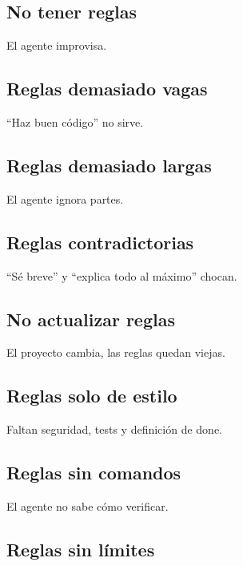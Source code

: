\subsection{No tener reglas}\label{no-tener-reglas}

El agente improvisa.

\subsection{Reglas demasiado vagas}\label{reglas-demasiado-vagas}

``Haz buen código'' no sirve.

\subsection{Reglas demasiado largas}\label{reglas-demasiado-largas}

El agente ignora partes.

\subsection{Reglas contradictorias}\label{reglas-contradictorias}

``Sé breve'' y ``explica todo al máximo'' chocan.

\subsection{No actualizar reglas}\label{no-actualizar-reglas}

El proyecto cambia, las reglas quedan viejas.

\subsection{Reglas solo de estilo}\label{reglas-solo-de-estilo}

Faltan seguridad, tests y definición de done.

\subsection{Reglas sin comandos}\label{reglas-sin-comandos}

El agente no sabe cómo verificar.

\subsection{Reglas sin límites}\label{reglas-sin-luxedmites}

